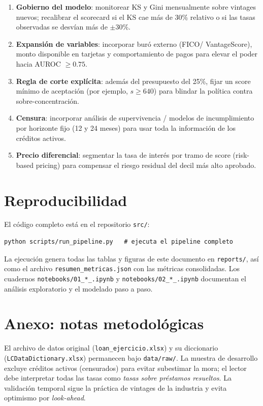 \documentclass[11pt, letterpaper]{article}
\newcommand{\bt}[1]{\textbf{#1}}
\begin{document}
\begin{enumerate}
  \item \bt{Gobierno del modelo}: monitorear KS y Gini mensualmente sobre
        vintages nuevos; recalibrar el scorecard si el KS cae más de 30\%
        relativo o si las tasas observadas se desvían más de $\pm30\%$.
  \item \bt{Expansión de variables}: incorporar buró externo (FICO/
        VantageScore), monto disponible en tarjetas y comportamiento de
        pagos para elevar el poder hacia AUROC $\geq 0.75$.
  \item \bt{Regla de corte explícita}: además del presupuesto del 25\%,
        fijar un score mínimo de aceptación (por ejemplo, $s \geq 640$)
        para blindar la política contra sobre-concentración.
  \item \bt{Censura}: incorporar análisis de supervivencia / modelos
        de incumplimiento por horizonte fijo (12 y 24 meses) para usar toda
        la información de los créditos activos.
  \item \bt{Precio diferencial}: segmentar la tasa de interés por tramo de
        score (risk-based pricing) para compensar el riesgo residual del
        decil más alto aprobado.
\end{enumerate}

\section*{Reproducibilidad}

El código completo está en el repositorio \texttt{src/}:

\begin{verbatim}
python scripts/run_pipeline.py   # ejecuta el pipeline completo
\end{verbatim}

La ejecución genera todas las tablas y figuras de este documento en
\texttt{reports/}, así como el archivo \texttt{resumen\_metricas.json} con
las métricas consolidadas. Los cuadernos \texttt{notebooks/01\_*\_.ipynb} y
\texttt{notebooks/02\_*\_.ipynb} documentan el análisis exploratorio y el
modelado paso a paso.

\section*{Anexo: notas metodológicas}

El archivo de datos original (\texttt{loan\_ejercicio.xlsx}) y su diccionario
(\texttt{LCDataDictionary.xlsx}) permanecen bajo \texttt{data/raw/}. La
muestra de desarrollo excluye créditos activos (censurados) para evitar
subestimar la mora; el lector debe interpretar todas las tasas como
\emph{tasas sobre préstamos resueltos}. La validación temporal sigue la
práctica de vintages de la industria y evita optimismo por
\emph{look-ahead}.
\end{document}
